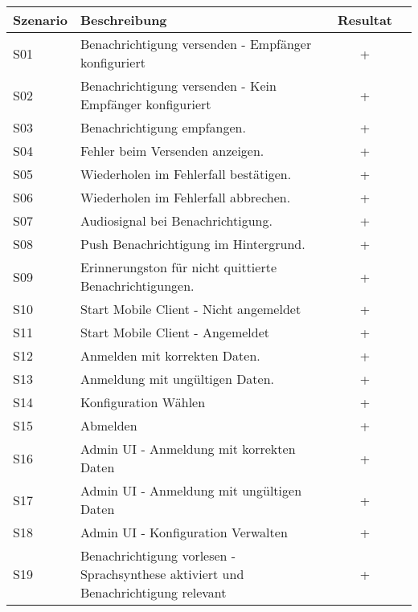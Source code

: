 \begin{table}[h]
    \centering
    \begin{tabular}{|l|p{11cm}|c|c|}
        \hline
        \textbf{Szenario} & \textbf{Beschreibung} & \textbf{Resultat} \\
        \hline
        S01         & Benachrichtigung versenden - Empfänger konfiguriert   & +\\
        \hline
        S02         & Benachrichtigung versenden - Kein Empfänger konfiguriert & +\\
        \hline
        S03         & Benachrichtigung empfangen.  & +\\
        \hline
        S04         & Fehler beim Versenden anzeigen.  & +\\
        \hline
        S05         & Wiederholen im Fehlerfall bestätigen.  & +\\
        \hline
        S06         & Wiederholen im Fehlerfall abbrechen.  & +\\
        \hline
        S07         & Audiosignal bei Benachrichtigung.   & +\\
        \hline
        S08         & Push Benachrichtigung im Hintergrund.  & +\\
        \hline
        S09         & Erinnerungston für nicht quittierte Benachrichtigungen.   & +\\
        \hline
        S10         & Start Mobile Client - Nicht angemeldet   & +\\
        \hline
        S11         & Start Mobile Client  - Angemeldet & +\\
        \hline
        S12         & Anmelden mit korrekten Daten.   & +\\
        \hline
        S13         & Anmeldung mit ungültigen Daten.   & +\\
        \hline
        S14         & Konfiguration Wählen   & +\\
        \hline
        S15         & Abmelden   & +\\
        \hline
        S16         & Admin UI - Anmeldung mit korrekten Daten   & +\\
        \hline
        S17         & Admin UI - Anmeldung mit ungültigen Daten   & +\\
        \hline
        S18         & Admin UI - Konfiguration Verwalten   & +\\
        \hline
        S19         & Benachrichtigung vorlesen - Sprachsynthese aktiviert und Benachrichtigung relevant & +\\

\end{tabular}
\end{table}
